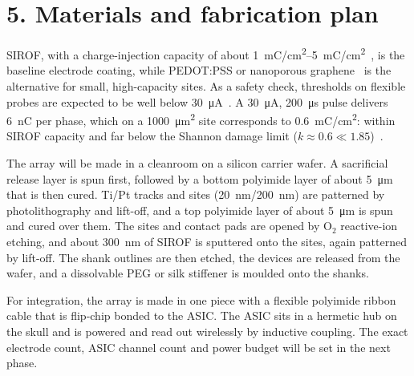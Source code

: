 \documentclass[11pt]{article}
\begin{document}
\section*{5. Materials and fabrication plan}
SIROF, with a charge-injection capacity of about \SIrange{1}{5}{mC/cm^2}~\cite{cogan2008}, is the baseline electrode coating, while PEDOT:PSS or nanoporous graphene~\cite{viana2024} is the alternative for small, high-capacity sites. As a safety check, thresholds on flexible probes are expected to be well below \SI{30}{\micro A}~\cite{lycke2023}. A \SI{30}{\micro A}, \SI{200}{\micro s} pulse delivers \SI{6}{nC} per phase, which on a \SI{1000}{\micro m^2} site corresponds to \SI{0.6}{mC/cm^2}: within SIROF capacity and far below the Shannon damage limit ($k \approx 0.6 \ll 1.85$)~\cite{shannon1992}.
 
The array will be made in a cleanroom on a silicon carrier wafer. A sacrificial release layer is spun first, followed by a bottom polyimide layer of about \SI{5}{\micro m} that is then cured. Ti/Pt tracks and sites (\SI{20}{nm}/\SI{200}{nm}) are patterned by photolithography and lift-off, and a top polyimide layer of about \SI{5}{\micro m} is spun and cured over them. The sites and contact pads are opened by O$_2$ reactive-ion etching, and about \SI{300}{nm} of SIROF is sputtered onto the sites, again patterned by lift-off. The shank outlines are then etched, the devices are released from the wafer, and a dissolvable PEG or silk stiffener is moulded onto the shanks.
 
For integration, the array is made in one piece with a flexible polyimide ribbon cable that is flip-chip bonded to the ASIC. The ASIC sits in a hermetic hub on the skull and is powered and read out wirelessly by inductive coupling. The exact electrode count, ASIC channel count and power budget will be set in the next phase.
 
\end{document}
